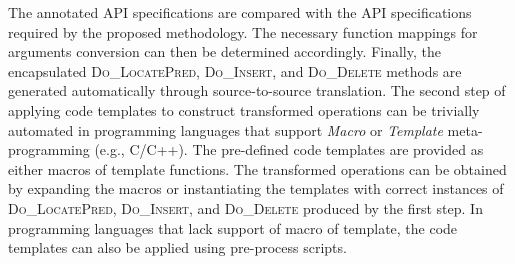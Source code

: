\documentclass{article}
\begin{document}
The annotated API specifications are compared with the API specifications required by the proposed methodology.
The necessary function mappings for arguments conversion can then be determined accordingly.
Finally, the encapsulated \textsc{Do\_LocatePred}, \textsc{Do\_Insert}, and \textsc{Do\_Delete} methods are generated automatically through source-to-source translation.
The second step of applying code templates to construct transformed operations can be trivially automated in programming languages that support \emph{Macro} or \emph{Template} meta-programming (e.g., C/C++).
The pre-defined code templates are provided as either macros of template functions.
The transformed operations can be obtained by expanding the macros or instantiating the templates with correct instances of \textsc{Do\_LocatePred}, \textsc{Do\_Insert}, and \textsc{Do\_Delete} produced by the first step.
In programming languages that lack support of macro of template, the code templates can also be applied using pre-process scripts.
\end{document}
